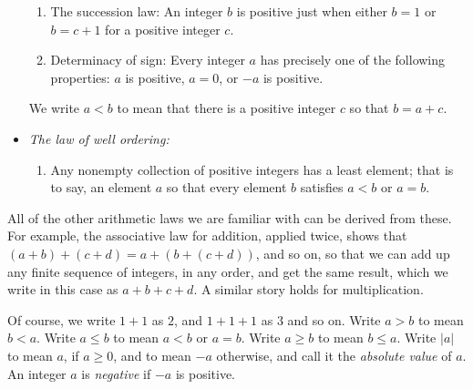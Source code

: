 \begin{itemize}
\begin{enumerate}
\item The succession law: An integer \(b\) is positive just when either \(b=1\) or \(b=c+1\) for a positive integer \(c\).
\item Determinacy of sign: Every integer \(a\) has precisely one of the following properties: \(a\) is positive, \(a=0\), or \(-a\) is positive.
\end{enumerate}
We write \(a<b\) to mean that there is a positive integer \(c\) so that \(b=a+c\). 
\smallskip
\item[]\emph{The law of well ordering:}
\begin{enumerate}
\item
Any nonempty collection of positive integers has a least element; that is to say, an element \(a\) so that every element \(b\) satisfies \(a<b\) or \(a=b\).
\end{enumerate}
\end{itemize}
\smallskip\noindent{}All of the other arithmetic laws we are familiar with can be derived from these.
For example, the associative law for addition, applied twice, shows that \((a+b)+(c+d)=a+(b+(c+d))\), and so on, so that we can add up any finite sequence of integers, in any order, and get the same result, which we write in this case as \(a+b+c+d\).
A similar story holds for multiplication.

Of course, we write \(1+1\) as \(2\), and \(1+1+1\) as \(3\) and so on.
Write \(a>b\) to mean \(b<a\).
Write \(a\le b\) to mean \(a<b\) or \(a=b\). 
Write \(a\ge b\) to mean \(b \le a\).
Write \(|a|\) to mean \(a\), if \(a \ge 0\), and to mean \(-a\) otherwise, and call it the \emph{absolute value} of \(a\).
An integer \(a\) is \emph{negative} if \(-a\) is positive.

\vspace{2cm}

